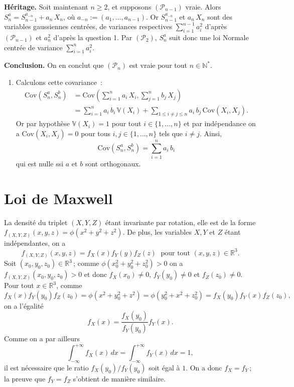 \textbf{Héritage.} Soit maintenant \(n\geq 2\), et supposons
\((\mathcal{P}_{n-1})\) vraie. Alors
\(S_n^a = S_{n-1}^{a_{-n}} + a_n\,X_n\), où
\(a_{-n} := (a_1,\dots,a_{n-1})\). Or \(S_{n-1}^{a_{-n}}\) et
\(a_n\,X_n\) sont des variables gaussiennes centrées, de variances
respectives \(\sum_{i = 1}^{n-1} a_i^2\) d'après \((\mathcal{P}_{n-1})\)
et \(a_n^2\) d'après la question 1. Par \((\mathcal{P}_2)\), \(S_n^a\)
suit donc une loi Normale centrée de variance \(\sum_{i = 1}^n a_i^2\).

\textbf{Conclusion.} On en conclut que \((\mathcal{P}_n)\) est vraie
pour tout \(n\in\mathbb{N}^\ast\).

\begin{enumerate}
\def\labelenumi{\arabic{enumi}.}
\setcounter{enumi}{2}
\tightlist
\item
  Calculons cette covariance~: \begin{align*}
  \text{Cov}\left(S_n^a, S_n^b\right) &= \text{Cov}\left(\sum_{i =1}^n a_i\,X_i, \sum_{j = 1}^n b_j\,X_j\right)\\
  &= \sum_{i = 1}^n a_i\,b_i\,\mathbb{V}\left(X_i\right) + \sum_{1\leq i\neq j \leq n} a_i\,b_j\,\text{Cov}\left(X_i,X_j\right).
  \end{align*} Or par hypothèse \(\mathbb{V}\left(X_i\right) = 1\) pour
  tout \(i\in\{1,\dots,n\}\) et par indépendance on a
  \(\text{Cov}\left(X_i,X_j\right) = 0\) pour tous
  \(i,j \in \{1,\dots,n\}\) tels que \(i\neq j\). Ainsi,
  \[ \text{Cov}\left(S_n^a, S_n^b\right) = \sum_{i = 1}^n a_i\,b_i \]
  qui est nulle ssi \(a\) et \(b\) sont orthogonaux.
\end{enumerate}

\section{Loi de Maxwell}\label{II-loi-de-maxwell-1}

\label{II-answer-Maxwell-1}
La densité du triplet \((X, Y, Z)\) étant invariante par rotation, elle
est de la forme \(f_{(X,Y,Z)} (x, y, z) = \phi(x^2 + y^2 + z^2)\). De
plus, les variables \(X, Y\) et \(Z\) étant indépendantes, on a
\[f_{(X,Y,Z)} (x, y, z) = f_X (x)f_Y (y)f_Z (z) \; \mbox{ pour tout $(x, y, z) \in \mathbb{R}^3$.} \]
Soit \((x_0,y_0,z_0) \in \mathbb{R}^3\)\,; comme
\(\phi(x_0^2 + y_0^2 + z_0^2) > 0\) on a
\(f_{(X, Y, Z)}(x_0, y_0, z_0) > 0\) et donc \(f_X(x_0) \neq 0\),
\(f_Y(y_0) \neq 0\) et \(f_Z(z_0) \neq 0\). Pour tout
\(x \in \mathbb{R}^3\), comme \[
f_X(x) f_Y(y_0) f_Z(z_0) = \phi(x^2 + y_0^2 + z^2) = \phi(y_0^2 + x^2 + z_0^2)
= f_X(y_0) f_Y(x) f_Z(z_0),
\] on a l'égalité \[
f_X(x) = \frac{f_X(y_0)}{f_Y(y_0)} f_Y(x).
\] Comme on a par ailleurs \[
\int_{-\infty}^{+\infty} f_X(x) \, dx = \int_{-\infty}^{+\infty} f_Y(x) \, dx = 1,
\] il est nécessaire que le ratio \({f_X(y_0)}/{f_Y(y_0)}\) soit égal à
\(1\). On a donc \(f_X = f_Y\)\,; la preuve que \(f_Y = f_Z\) s'obtient
de manière similaire.

